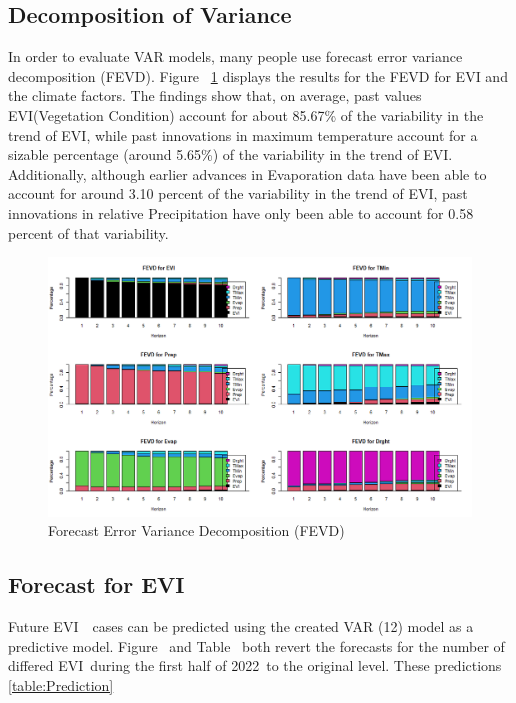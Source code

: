 \subsection{ Decomposition of Variance}
In order to evaluate VAR models, many people use forecast error variance decomposition (FEVD). Figure ~\ref{fig:fevd} displays the results for the FEVD for EVI and the climate factors. The findings show that, on average, past values EVI(Vegetation Condition)  account for about 85.67\% of the variability in the trend of EVI, while past innovations in maximum temperature account for a sizable percentage (around 5.65\%) of the variability in the trend of EVI. Additionally, although earlier advances in Evaporation data have been able to account for around 3.10 percent of the variability in the trend of EVI, past innovations in relative Precipitation have only been able to account for 0.58 percent of that variability.
\begin{figure}
	\centering
	\includegraphics[width=0.9\linewidth]{images/fevd}
	\caption{Forecast Error Variance Decomposition (FEVD)}
	\label{fig:fevd}
\end{figure}
\subsection{Forecast for EVI} Future EVI  cases can be predicted using the created VAR (12) model as a predictive model. Figure  and Table  both revert the forecasts for the number of differed EVI during the first half of 2022 to the original level. These predictions \ref{table:Prediction}

